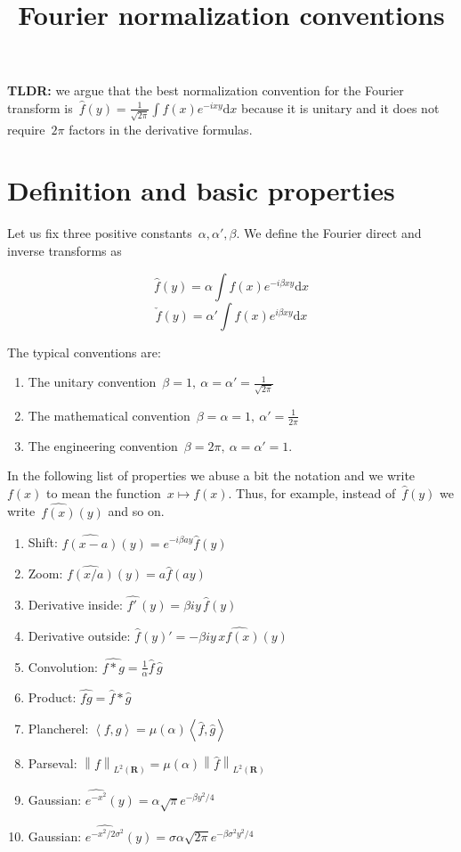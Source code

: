 
\newcommand{\ud}{\mathrm{d}}
\newcommand{\R}{\mathbf{R}}

\title{Fourier normalization conventions}

{\bf TLDR: } we argue that the best normalization convention for the Fourier
transform is~$\widehat{f}(y)=\tfrac{1}{\sqrt{2\pi}}\int f(x)e^{-ixy}\ud x$
because it is unitary and it does not require~$2\pi$ factors in the
derivative formulas.

\section{Definition and basic properties}

Let us fix three positive constants~$\alpha,\alpha',\beta$.  We define the
Fourier direct and inverse transforms as

$$
\widehat{f}\left(y\right)=\alpha\int f(x) e^{-i\beta xy}\ud x
$$
$$
\check{f}\left(y\right)=\alpha'\int f(x) e^{i\beta xy}\ud x
$$

The typical conventions are:

\begin{enumerate}
	\item The unitary convention~$\beta=1,\
		\alpha=\alpha'=\frac{1}{\sqrt{2\pi}}$
	\item The mathematical convention~$\beta=\alpha=1,\
		\alpha'=\frac{1}{2\pi}$
	\item The engineering convention~$\beta=2\pi,\ \alpha=\alpha'=1$.
\end{enumerate}

In the following list of properties we abuse a bit the notation and we
write~$f(x)$ to mean the function~$x\mapsto f(x)$.  Thus, for example,
instead of~$\widehat{f}(y)$ we write~$\widehat{f(x)}(y)$ and so on.

\begin{enumerate}
	\item Shift: $\widehat{f(x-a)}(y)=e^{-i\beta ay}\widehat{f}(y)$
	\item Zoom: $\widehat{f(x/a)}(y)=a\widehat{f}(ay)$
	\item Derivative inside: $\widehat{f'\,}(y)=\beta i y\,\widehat{f}(y)$
	\item Derivative outside: $\widehat{f}(y)'=-\beta i
		y\,\widehat{xf(x)}(y)$
	\item Convolution:
		$\widehat{f*g}=\frac{1}{\alpha}\widehat{f}\,\widehat{g}$
	\item Product:
		$\widehat{fg}=\widehat{f}*\widehat{g}$
	\item Plancherel:
		$\left<f,g\right>=\mu(\alpha)\left<\widehat{f},\widehat{g}\right>$
	\item Parseval:
		$\left\|f\right\|_{L^2(\R)}=\mu(\alpha)\left\|\widehat
		f\right\|_{L^2(\R)}$
	\item Gaussian:
		$\widehat{e^{-x^2}}(y)=\alpha\sqrt{\pi}e^{-\beta y^2/4}$\\
	\item Gaussian:
		$\widehat{e^{-x^2/2\sigma^2}}(y)=\sigma\alpha\sqrt{2\pi}e^{-\beta
		\sigma^2y^2/4}$\\
\end{enumerate}


